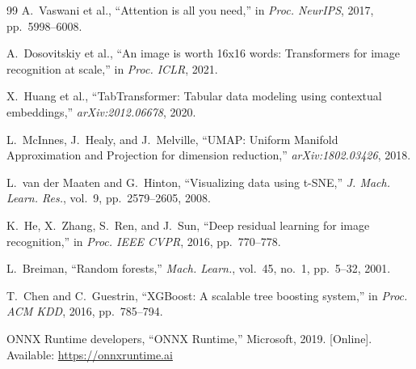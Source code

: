 \documentclass[conference]{IEEEtran}
\begin{document}
\begin{thebibliography}{99}
A.~Vaswani et al., ``Attention is all you need,'' in \textit{Proc. NeurIPS}, 2017, pp.~5998--6008.

A.~Dosovitskiy et al., ``An image is worth 16x16 words: Transformers for image recognition at scale,'' in \textit{Proc. ICLR}, 2021.

X.~Huang et al., ``TabTransformer: Tabular data modeling using contextual embeddings,'' \textit{arXiv:2012.06678}, 2020.

L.~McInnes, J.~Healy, and J.~Melville, ``UMAP: Uniform Manifold Approximation and Projection for dimension reduction,'' \textit{arXiv:1802.03426}, 2018.

L.~van der Maaten and G.~Hinton, ``Visualizing data using t-SNE,'' \textit{J. Mach. Learn. Res.}, vol.~9, pp.~2579--2605, 2008.

K.~He, X.~Zhang, S.~Ren, and J.~Sun, ``Deep residual learning for image recognition,'' in \textit{Proc. IEEE CVPR}, 2016, pp.~770--778.

L.~Breiman, ``Random forests,'' \textit{Mach. Learn.}, vol.~45, no.~1, pp.~5--32, 2001.

T.~Chen and C.~Guestrin, ``XGBoost: A scalable tree boosting system,'' in \textit{Proc. ACM KDD}, 2016, pp.~785--794.

ONNX Runtime developers, ``ONNX Runtime,'' Microsoft, 2019. [Online]. Available: \url{https://onnxruntime.ai}

\end{thebibliography}
\end{document}

